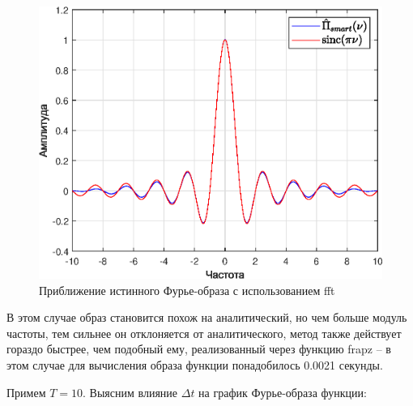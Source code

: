 \documentclass[a4paper]{article}
\begin{document}
\begin{figure}[H]
    \centering
    \includegraphics[width=0.55\linewidth]{graphs/3/T_50_dt_0.05005_V_20_dv_0.02/fourier_smart.eps}
    \caption{Приближение истинного Фурье-образа с использованием fft}
\end{figure}

В этом случае образ становится похож на аналитический, но чем больше модуль частоты, тем сильнее он отклоняется от аналитического, метод также действует гораздо быстрее, чем подобный ему, реализованный через функцию frapz -- в этом случае для вычисления образа функции понадобилось 0.0021 секунды.

Примем $T = 10$. Выясним влияние $\Delta t$ на график Фурье-образа функции:
\end{document}
